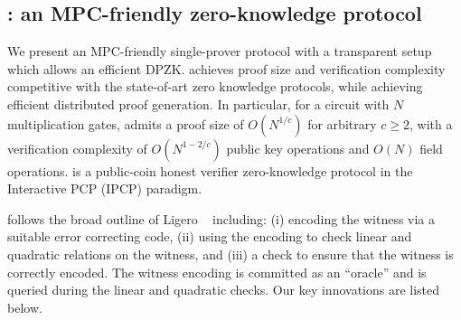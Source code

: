 \subsection{\name{}: an MPC-friendly zero-knowledge protocol}
We present an MPC-friendly single-prover protocol \name{} with a transparent setup which
allows an efficient  DPZK.
\name{} achieves proof size and verification complexity competitive with the
state-of-art zero knowledge protocols, while achieving efficient distributed
proof generation. In particular, for a circuit with $N$ multiplication gates,
\name{} admits a proof size of $O(N^{1/c})$ for
arbitrary $c\geq 2$, with a verification complexity of $O(N^{1-2/c})$ public key
operations and $O(N)$ field operations. \name{} is a public-coin honest verifier
zero-knowledge protocol in the Interactive PCP (IPCP) \cite{KR08, KR09, GIMS10}
paradigm. %


%

\name{} follows the broad outline of Ligero ~\cite{ligero} including: 
(i) encoding the witness via a suitable error correcting code, (ii) using the
encoding to check linear and quadratic relations on the
witness, and (iii) a check to ensure that the witness is correctly
encoded. The witness encoding is committed as an ``oracle'' and is queried
during the linear and quadratic checks.  Our key innovations are
listed below. 

